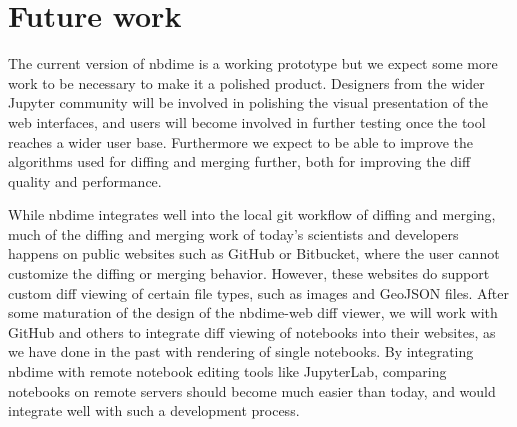 \documentclass{deliverablereport}
\begin{document}


\section{Future work}

The current version of nbdime is a working prototype but we expect
some more work to be necessary to make it a polished product.
Designers from the wider Jupyter community will be involved in
polishing the visual presentation of the web interfaces,
and users will become involved in further testing once the tool
reaches a wider user base. Furthermore we expect to be able to
improve the algorithms used for diffing and merging further,
both for improving the diff quality and performance.

While nbdime integrates well into the local git workflow of diffing and merging,
much of the diffing and merging work of today's scientists and developers happens
on public websites such as GitHub or Bitbucket,
where the user cannot customize the diffing or merging behavior.
However, these websites do support custom diff viewing of certain file types,
such as images and GeoJSON files.
After some maturation of the design of the nbdime-web diff viewer,
we will work with GitHub and others to integrate diff viewing of notebooks into their websites,
as we have done in the past with rendering of single notebooks.
By integrating nbdime with remote notebook editing tools like JupyterLab, comparing notebooks on remote servers should become much easier than today, and would integrate well with such a development process.
\end{document}

